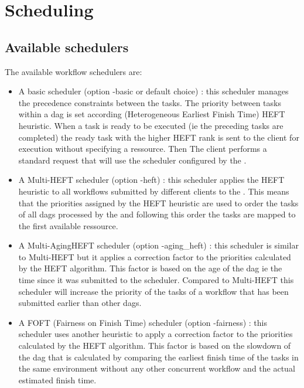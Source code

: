 \section{Scheduling}

\label{sec:wf_sched}

\subsection{Available schedulers}

The available \madag workflow schedulers are:

\begin{itemize}

\item A basic scheduler (option -basic or default choice) :
this scheduler manages the precedence constraints between the tasks. The
 priority between tasks within a dag is set according (Heterogeneous
Earliest Finish Time) HEFT~\cite{heft_cpop} heuristic. When a task is ready to be
executed (ie the preceding tasks are completed) the ready task with the higher
HEFT rank is sent to the client for execution without specifying a ressource.
Then The client performs a standard \diet request that will use the scheduler
configured by the \sed.

\item A Multi-HEFT scheduler (option -heft) : this scheduler applies
the HEFT heuristic to all workflows submitted by different clients to
the \madag. This means that the priorities assigned by the HEFT
heuristic are used to order the tasks of all dags processed by the
\madag and following this order the tasks are mapped to the first
available ressource.

\item A Multi-AgingHEFT scheduler (option -aging\_heft) : this scheduler
is similar to Multi-HEFT but it applies a correction factor to the
priorities calculated by the HEFT algorithm. This factor is based on
the age of the dag ie the time since it was submitted to the scheduler.
Compared to Multi-HEFT this scheduler will increase the priority of the
tasks of a workflow that has been submitted earlier than other dags.

\item A FOFT (Fairness on Finish Time) scheduler (option -fairness) :
this scheduler uses another heuristic to apply a correction factor to
the priorities calculated by the HEFT algorithm. This factor is based
on the slowdown of the dag that is calculated by comparing the earliest
finish time of the tasks in the same environment without any other
concurrent workflow and the actual estimated finish time.

\end{itemize}

